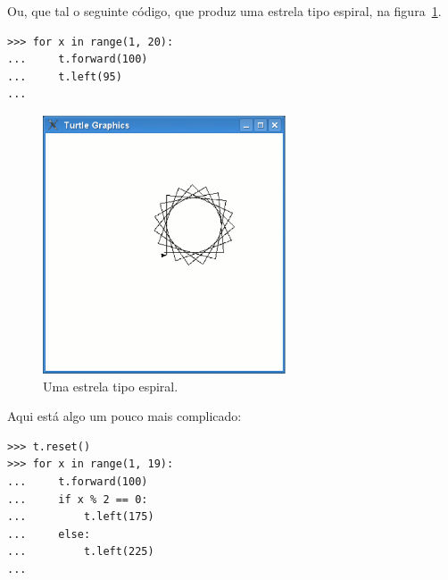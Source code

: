 \noindent
Ou, que tal o seguinte código, que produz uma estrela tipo espiral, na figura~\ref{fig22}.

\begin{listing}
\begin{verbatim}
>>> for x in range(1, 20):
...     t.forward(100)
...     t.left(95)
...
\end{verbatim}
\end{listing}

\begin{figure}
\begin{center}
\includegraphics[width=72mm]{eps/figure22.eps}
\end{center}
\caption{Uma estrela tipo espiral.}\label{fig22}
\end{figure}

\noindent
Aqui está algo um pouco mais complicado:

\begin{listing}
\begin{verbatim}
>>> t.reset()
>>> for x in range(1, 19):
...     t.forward(100)
...     if x % 2 == 0:
...         t.left(175)
...     else:
...         t.left(225)
...
\end{verbatim}
\end{listing}


